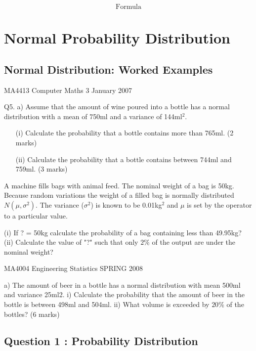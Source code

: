 \documentclass[12pt]{report}
\begin{document}
\[ \mbox{Formula} \]



\chapter{Normal Probability Distribution}
\section{Normal Distribution: Worked Examples}

MA4413    Computer Maths 3     January 2007


Q5. a) Assume that the amount of wine poured into a bottle has a normal distribution with a mean of 750ml and a variance of 144ml$^2$.

\begin{itemize}

\item[(i)]  Calculate the probability that a bottle contains more than 765ml. (2 marks)
\item[(ii)]    Calculate the probability that a bottle contains between 744ml and 759ml. (3 marks)
\end{itemize}
A machine fills bags with animal feed. The nominal weight of a bag is 50kg.
Because random variations the weight of a filled bag is normally distributed
$N(\mu, \sigma^2)$. The variance ($\sigma^2$) is known to be 0.01kg$^2$ and $\mu$ is set by the
operator to a particular value.

(i) If ? = 50kg calculate the probability of a bag containing less than
49.95kg?
(ii) Calculate the value of "?" such that only $2\%$ of the output are under the
nominal weight?



MA4004     Engineering Statistics    SPRING 2008


a)	The amount of beer in a bottle has a normal distribution with mean 500ml and variance 25ml2.
i)	Calculate the probability that the amount of beer in the bottle is between 498ml and 504ml.
ii)	What volume is exceeded by $20\%$ of the bottles?
(6 marks)





\section*{Question 1 : Probability Distribution}
\end{document}
